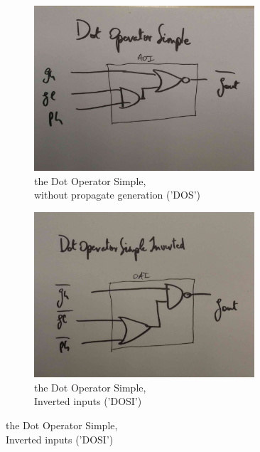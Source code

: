 \documentclass[english]{article}
\begin{document}
\begin{figure}[h!]
\centering
\begin{subfigure}{.5\textwidth}
  \centering
  \includegraphics[width=0.9\textwidth]{figures/dos}
\caption{the Dot Operator Simple, \\without propagate generation ('DOS')}
\label{DOS}
\end{subfigure}%
\begin{subfigure}{.5\textwidth}
  \centering
\includegraphics[width=0.9\textwidth]{figures/dosi}
\caption{the Dot Operator Simple, \\Inverted inputs ('DOSI')}
\label{DOSI}
\end{subfigure}
\end{figure}
\end{document}
